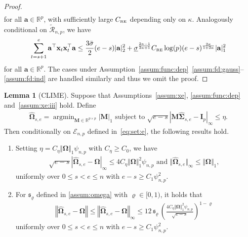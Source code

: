 \documentclass[11pt, a4paper]{article}
\newcommand{\mbf}{\mathbf}
\newcommand{\mc}{\mathcal}
\renewcommand{\l}{\left}
\renewcommand{\r}{\right}
\def\wh{\widehat}
\def\wt{\widetilde}
\newcommand{\R}{\mathbb{R}}
\newcommand{\crsc}{C_{\text{\tiny \upshape RE}}}
\theoremstyle{definition}
\theoremstyle{definition}
\theoremstyle{definition}
\newtheorem{lem}[thm]{Lemma}
\theoremstyle{definition}
\theoremstyle{definition}
\theoremstyle{remark}
\theoremstyle{definition}
\theoremstyle{definition}
\theoremstyle{definition}
\begin{document}
\begin{proof}
\begin{align*}
	\end{align*}
	for all $\mbf a \in \R^p$, with sufficiently large $\crsc$ depending only on $\kappa$. 	Analogously conditional on $\wt{\mc R}_{n, p}$, we have
	\begin{align*}
	\sum_{t = s + 1}^e \mbf a^\top \mbf x_t \mbf x_t^\top \mbf a 
	\le \frac{3\bar{\sigma}}{2} (e - s) \vert \mbf a \vert_2^2 +  \underline{\sigma}^{\frac{2\kappa - 1}{2\kappa + 1}} \crsc \log(p) (e - s)^{\frac{2\kappa}{1 + 2\kappa}} \vert \mbf a \vert_1^2
	\end{align*}
	for all $\mbf a \in \R^p$.
	The cases under Assumption~\ref{assum:func:dep}~\ref{assum:fd:gauss}--\ref{assum:fd:ind} are handled similarly and thus we omit the proof.
\end{proof}

\begin{lem}[CLIME]
	\label{lem:clime}
	Suppose that Assumptions~\ref{assum:xe}, \ref{assum:func:dep} and~\ref{assum:xe:iii} hold. Define 
	\begin{align}\label{eq:clime}
	\wh{\bm\Omega}_{s, e} = \mathop{\arg\min}_{\mbf M \in \R^{p \times p}} \vert \mbf M \vert_1 \text{ \ subject to \ } 
	\sqrt{e - s} \l\vert \mbf M \wh{\bm\Sigma}_{s, e} - \mbf I_p \r\vert_\infty \le \eta.
	\end{align}
	Then conditionally on $\mc E_{n, p}$ defined in~\eqref{eq:set:e}, the following results hold.
	\begin{enumerate}[label = (\roman*)]
		\item \label{lem:clime:one} Setting $\eta = C_\eta \Vert \bm\Omega \Vert_1 \psi_{n, p}$ with $C_\eta \ge C_0$, we have
		\begin{align*}
		\sqrt{e-s}\l\vert \wh{\bm\Omega}_{s, e} - \bm\Omega \r\vert_\infty \le 4 C_\eta \Vert \bm\Omega \Vert_1^2 \psi_{n, p} \text{ \ and \ } \Vert \wh{\bm\Omega}_{s, e} \Vert_\infty \le \Vert \bm\Omega \Vert_1,
		\end{align*}
		uniformly over $0 \le s < e \le n$ with $e - s \ge C_1\psi_{n, p}^2$.
		
		\item \label{lem:clime:two} 
		For $\mathfrak{s}_{\varrho}$ defined in \cref{assum:omega} with $\varrho \in [0, 1)$, it holds that 
		\begin{align*}
		\l\Vert \wh{\bm\Omega}_{s, e} - \bm\Omega \r\Vert \le \l\Vert \wh{\bm\Omega}_{s, e} - \bm\Omega \r\Vert_\infty \le 12\, \mathfrak{s}_{\varrho}\,
		\l(\frac{4 C_\eta \Vert \bm\Omega \Vert_1^2 \psi_{n, p} }{\sqrt{e-s}}\r)^{1 - \varrho}
		\end{align*}
		uniformly over $0 \le s < e \le n$ with $e - s \ge C_1\psi_{n, p}^2$.
	\end{enumerate}
\end{lem}
\end{document}
